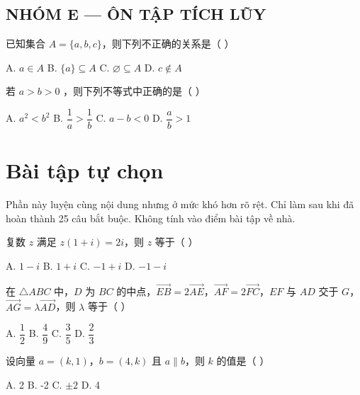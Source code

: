 \documentclass[11pt, a4paper]{article}
\begin{document}
\subsection*{NHÓM E — ÔN TẬP TÍCH LŨY}

\begin{baitap}[24]
已知集合 $A=\{a,b,c\}$，则下列不正确的关系是（ ）
\par\vspace{3pt}
\noindent A. $a \in A$ \quad B. $\{a\} \subseteq A$ \quad C. $\varnothing \subseteq A$ \quad D. $c \notin A$
\end{baitap}

\begin{baitap}[25]
若 $a > b > 0$ ，则下列不等式中正确的是（ ）
\par\vspace{3pt}
\noindent A. $a^2 < b^2$ \quad B. $\dfrac{1}{a} > \dfrac{1}{b}$ \quad C. $a - b < 0$ \quad D. $\dfrac{a}{b} > 1$
\end{baitap}

\clearpage
\section{Bài tập tự chọn}

Phần này luyện cùng nội dung nhưng ở mức khó hơn rõ rệt. Chỉ làm sau khi đã hoàn thành 25 câu bắt buộc. Không tính vào điểm bài tập về nhà.

\begin{baitap}[1]
复数 $z$ 满足 $z(1 + i) = 2i$，则 $z$ 等于（ ）
\par\vspace{3pt}
\noindent A. $1 - i$ \quad B. $1 + i$ \quad C. $-1 + i$ \quad D. $-1 - i$
\end{baitap}

\begin{baitap}[2]
在 $\triangle ABC$ 中，$D$ 为 $BC$ 的中点，$\overrightarrow{EB} = 2\overrightarrow{AE}$，$\overrightarrow{AF} = 2\overrightarrow{FC}$，$EF$ 与 $AD$ 交于 $G$，$\overrightarrow{AG} = \lambda \overrightarrow{AD}$，则 $\lambda$ 等于（ ）
\par\vspace{3pt}
\noindent A. $\dfrac{1}{2}$ \quad B. $\dfrac{4}{9}$ \quad C. $\dfrac{3}{5}$ \quad D. $\dfrac{2}{3}$
\end{baitap}

\begin{baitap}[3]
设向量 $a = (k,1)$，$b = (4,k)$ 且 $a \parallel b$，则 $k$ 的值是（ ）
\par\vspace{3pt}
\noindent A. 2 \quad B. -2 \quad C. $\pm 2$ \quad D. 4
\end{baitap}
\end{document}
